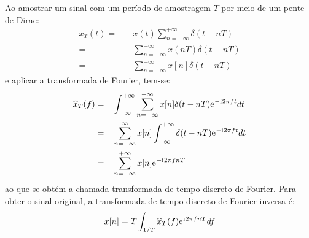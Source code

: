 \documentclass[12pt,a4paper]{report}
\newcommand{\I}{{\mathrm{i}\mkern1mu}}
\newcommand{\euler}{{\mathrm{e}\mkern1mu}}
\begin{document}
  Ao amostrar um sinal com um período de amostragem $T$ por meio de um pente de Dirac:
  \begin{equation}
    \begin{split}
      x_T(t) = &\quad x(t) \sum_{n = -\infty}^{+\infty} \delta(t - n T) \\
      = &\quad \sum_{n = -\infty}^{+\infty} x(n T) \delta(t - n T) \\
      = &\quad \sum_{n = -\infty}^{+\infty} x[n] \delta(t - n T)
    \end{split}
    \label{eq:dirac_comb}
  \end{equation}
  e aplicar a transformada de Fourier, tem-se:
  \begin{equation}
    \begin{split}
      \widehat{x}_T(f) = &\quad \int_{-\infty}^{+\infty} \sum_{n = -\infty}^{+\infty}
                                x[n] \delta(t - n T) \euler^{-\I 2 \pi f t} dt
      \\ = &\quad \sum_{n = -\infty}^{\infty} x[n] \int_{-\infty}^{+\infty}
                                \delta(t - n T) \euler^{-\I 2 \pi f t} dt
      \\ = &\quad \sum_{n = -\infty}^{+\infty} x[n] \euler^{-\I 2 \pi f n T}
    \end{split}
  \end{equation}
  ao que se obtém a chamada transformada de tempo discreto de Fourier. Para obter o sinal original, a
  transformada de tempo discreto de Fourier inversa é:
  \begin{equation}
    x[n] = T \int_{1/T} \widehat{x}_T(f) \euler^{\I 2 \pi f n T} df
  \end{equation}
\end{document}
